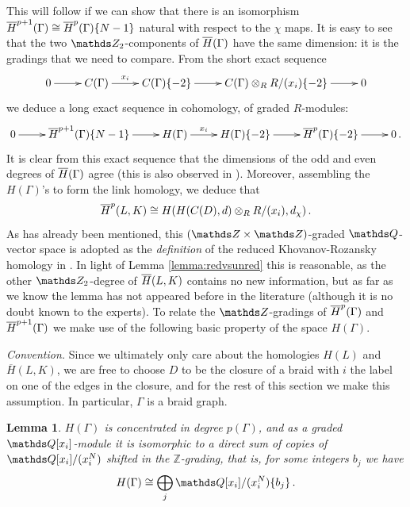 \documentclass{compositio}
\newtheorem{lemma}[theorem]{Lemma}
\theoremstyle{definition}
\numberwithin{equation}{section}
\begin{document}
This will follow if we can show that there is an isomorphism $\overline{H}^{p+1}(\Gamma) \cong \overline{H}^p(\Gamma)\{N-1\}$ natural with respect to the $\chi$ maps. It is easy to see that the two $\Ztwo$-components of $\overline{H}(\Gamma)$ have the same dimension: it is the gradings that we need to compare. From the short exact sequence
\[
\xymatrix{%
0 \ar[r] & C(\Gamma) \ar[r]^-{x_{i}} & C(\Gamma)\{-2\} \ar[r] & C(\Gamma) \otimes_R R/(x_{i})\{-2\} \ar[r] & 0
}
\]
we deduce a long exact sequence in cohomology, of graded $R$-modules:
\begin{equation}\label{eq:redvsunred_seq}
\xymatrix{%
0 \ar[r] & \redh^{p+1}(\Gamma)\{N-1\} \ar[r] & H(\Gamma) \ar[r]^-{x_{i}} & H(\Gamma)\{-2\} \ar[r] & \redh^p(\Gamma)\{-2\} \ar[r] & 0 \, .
}
\end{equation}
It is clear from this exact sequence that the dimensions of the odd and even degrees of $\overline{H}(\Gamma)$ agree (this is also observed in \cite[Proposition 3.12]{r0607544}). Moreover, assembling the $H(\Gamma)$'s to form the link homology, we deduce that
\[
\overline{H}^p(L, K) \cong H(H(C(D),d) \otimes_R R/(x_i), d_{\chi})\,.
\]
As has already been mentioned, this $(\ZZ \times \ZZ)$-graded $\QQ$-vector space is adopted as the \emph{definition} of the reduced Khovanov-Rozansky homology in \cite{r0607544,websterblah, rasmussenblah}. In light of Lemma \ref{lemma:redvsunred} this is reasonable, as the other $\Ztwo$-degree of $\overline{H}(L,K)$ contains no new information, but as far as we know the lemma has not appeared before in the literature (although it is no doubt known to the experts). To relate the $\ZZ$-gradings of $\overline{H}^p(\Gamma)$ and $\overline{H}^{p+1}(\Gamma)$ we make use of the following basic property of the space $H(\Gamma)$.

\textit{Convention.} Since we ultimately only care about the homologies $H(L)$ and $\overline{H}(L,K)$, we are free to choose $D$ to be the closure of a braid with $i$ the label on one of the edges in the closure, and for the rest of this section we make this assumption. In particular, $\Gamma$ is a braid graph.

\begin{lemma}\label{lemma:directsumalgebras} $H(\Gamma)$ is concentrated in degree $p(\Gamma)$, and as a graded $\QQ[x_i]$-module it is isomorphic to a direct sum of copies of $\QQ[x_i]/(x_i^N)$ shifted in the $\mathds{Z}$-grading, that is, for some integers $b_j$ we have
\[
H(\Gamma) \cong \bigoplus_{j} \QQ[x_i]/(x_i^N)\{b_j\} \, .
\]
\end{lemma}
\end{document}
